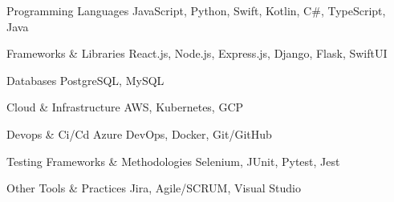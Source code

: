 

\begin{cvskills}

          \cvskill
            {Programming Languages} %
            {JavaScript, Python, Swift, Kotlin, C\#, TypeScript, Java} %
          

          \cvskill
            {Frameworks \& Libraries} %
            {React.js, Node.js, Express.js, Django, Flask, SwiftUI} %
          

          \cvskill
            {Databases} %
            {PostgreSQL, MySQL} %
          

          \cvskill
            {Cloud \& Infrastructure} %
            {AWS, Kubernetes, GCP} %
          

          \cvskill
            {Devops \& Ci/Cd} %
            {Azure DevOps, Docker, Git/GitHub} %
          

          \cvskill
            {Testing Frameworks \& Methodologies} %
            {Selenium, JUnit, Pytest, Jest} %
          

          \cvskill
            {Other Tools \& Practices} %
            {Jira, Agile/SCRUM, Visual Studio} %
          
\end{cvskills}
